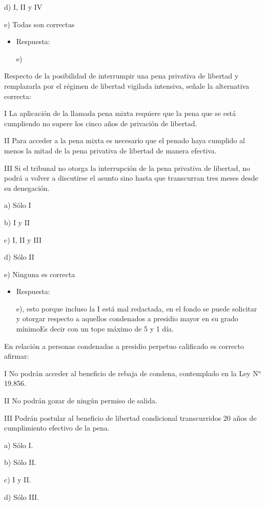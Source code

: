 \documentclass[letterpaper, 11pt]{article}
\begin{document}
d) I, II y IV

e) Todas son correctas

\begin{itemize}
\item Respuesta:

e)
\end{itemize}


Respecto de la posibilidad de interrumpir una pena privativa de
libertad y remplazarla por el régimen de libertad vigilada intensiva,
señale la alternativa correcta:

I La aplicación de la llamada pena mixta requiere que la pena que se
está cumpliendo no supere los cinco años de privación de libertad.

II Para acceder a la pena mixta es necesario que el penado haya
cumplido al menos la mitad de la pena privativa de libertad de manera
efectiva.

III Si el tribunal no otorga la interrupción de la pena privativa de
libertad, no podrá a volver a discutirse el asunto sino hasta que
transcurran tres meses desde su denegación.


a) Sólo I

b) I y II

c) I, II y III

d) Sólo II

e) Ninguna es correcta

\begin{itemize}
\item Respuesta:

e), esto porque incluso la I está mal redactada, en el fondo se
puede solicitar y otorgar respecto a aquellos condenados a presidio
mayor en su grado mínimoEs decir con un tope máximo de 5 y 1 día.
\end{itemize}


En relación a personas condenadas a presidio perpetuo calificado es
correcto afirmar:

I No podrán acceder al beneficio de rebaja de condena, contemplado en
la Ley N° 19.856.

II No podrán gozar de ningún permiso de salida.

III Podrán postular al beneficio de libertad condicional transcurridos
20 años de cumplimiento efectivo de la pena.

a) Sólo I.


b) Sólo II.



c) I y II.


d) Sólo III.
\end{document}
